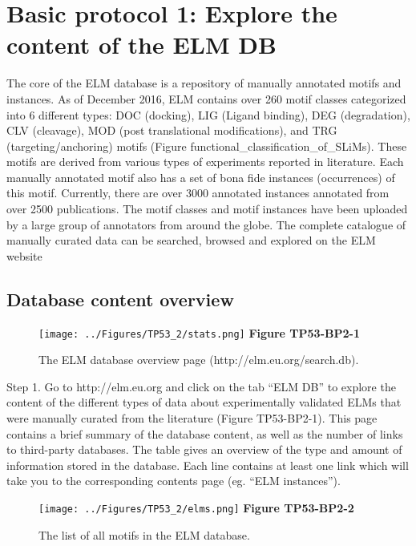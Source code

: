 \section{Basic protocol 1: Explore the content of the ELM
DB}\label{basic-protocol-1-explore-the-content-of-the-elm-db}

The core of the ELM database is a repository of manually annotated
motifs and instances. As of December 2016, ELM contains over 260 motif
classes categorized into 6 different types: DOC (docking), LIG (Ligand
binding), DEG (degradation), CLV (cleavage), MOD (post translational
modifications), and TRG (targeting/anchoring) motifs (Figure
functional\_classification\_of\_SLiMs). These motifs are derived from
various types of experiments reported in literature. Each manually
annotated motif also has a set of bona fide instances (occurrences) of
this motif. Currently, there are over 3000 annotated instances annotated
from over 2500 publications. The motif classes and motif instances have
been uploaded by a large group of annotators from around the globe. The
complete catalogue of manually curated data can be searched, browsed and
explored on the ELM website

\subsection{Database content overview}\label{database-content-overview}

\begin{figure}[h!]
\centering
\texttt{[image: ../Figures/TP53\_2/stats.png]} \textbf{Figure TP53-BP2-1}
\caption{
The ELM database overview page (http://elm.eu.org/search.db).
}
\end{figure}

Step 1. Go to http://elm.eu.org and click on the tab ``ELM DB'' to
explore the content of the different types of data about experimentally
validated ELMs that were manually curated from the literature (Figure
TP53-BP2-1). This page contains a brief summary of the database content,
as well as the number of links to third-party databases. The table gives
an overview of the type and amount of information stored in the
database. Each line contains at least one link which will take you to
the corresponding contents page (eg. ``ELM instances'').

\begin{figure}[h!]
\centering
\texttt{[image: ../Figures/TP53\_2/elms.png]} \textbf{Figure TP53-BP2-2}
\caption{
The list of all motifs in the ELM database.
}
\end{figure}

